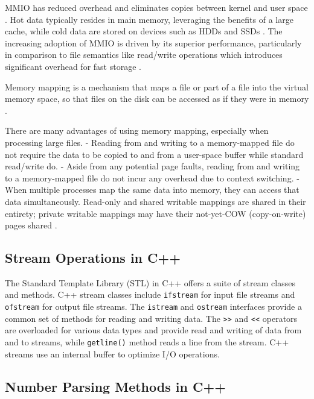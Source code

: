 MMIO has reduced overhead and eliminates copies between kernel and user space \cite{malliotakis2021hugemap, papagiannis2020optimizing}. Hot data typically resides in main memory, leveraging the benefits of a large cache, while cold data are stored on devices such as HDDs and SSDs \cite{song2016efficient}. The increasing adoption of MMIO is driven by its superior performance, particularly in comparison to file semantics like read/write operations which introduces significant overhead for fast storage \cite{yoshimura2019evfs, enberg2022transcending}. 


Memory mapping is a mechanism that maps a file or part of a file into the virtual memory space, so that files on the disk can be accessed as if they were in memory \cite{lin2014mmap}.

There are many advantages of using memory mapping, especially when processing large files. - Reading from and writing to a memory-mapped file do not require the data to be copied to and from a user-space buffer while standard read/write do. - Aside from any potential page faults, reading from and writing to a memory-mapped file do not incur any overhead due to context switching. - When multiple processes map the same data into memory, they can access that data simultaneously. Read-only and shared writable mappings are shared in their entirety; private writable mappings may have their not-yet-COW (copy-on-write) pages shared \cite{lin2014mmap}.



\subsection{Stream Operations in C++}

The Standard Template Library (STL) in C++ offers a suite of stream classes and methods. C++ stream classes include \texttt{ifstream} for input file streams and \texttt{ofstream} for output file streams. The \texttt{istream} and \texttt{ostream} interfaces provide a common set of methods for reading and writing data. The \texttt{>>} and \texttt{<<} operators are overloaded for various data types and provide read and writing of data from and to streams, while \texttt{getline()} method reads a line from the stream. C++ streams use an internal buffer to optimize I/O operations.




\subsection{Number Parsing Methods in C++}

